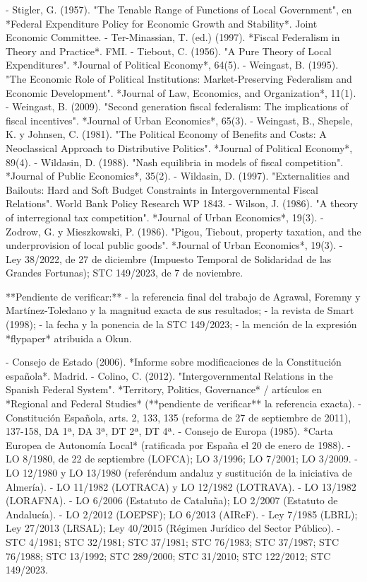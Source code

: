 \documentclass[10pt,a4paper]{article}
\begin{document}
{- Stigler, G. (1957). "The Tenable Range of Functions of Local Government", en *Federal Expenditure Policy for Economic Growth and Stability*. Joint Economic Committee.
- Ter-Minassian, T. (ed.) (1997). *Fiscal Federalism in Theory and Practice*. FMI.
- Tiebout, C. (1956). "A Pure Theory of Local Expenditures". *Journal of Political Economy*, 64(5).
- Weingast, B. (1995). "The Economic Role of Political Institutions: Market-Preserving Federalism and Economic Development". *Journal of Law, Economics, and Organization*, 11(1).
- Weingast, B. (2009). "Second generation fiscal federalism: The implications of fiscal incentives". *Journal of Urban Economics*, 65(3).
- Weingast, B., Shepsle, K. y Johnsen, C. (1981). "The Political Economy of Benefits and Costs: A Neoclassical Approach to Distributive Politics". *Journal of Political Economy*, 89(4).
- Wildasin, D. (1988). "Nash equilibria in models of fiscal competition". *Journal of Public Economics*, 35(2).
- Wildasin, D. (1997). "Externalities and Bailouts: Hard and Soft Budget Constraints in Intergovernmental Fiscal Relations". World Bank Policy Research WP 1843.
- Wilson, J. (1986). "A theory of interregional tax competition". *Journal of Urban Economics*, 19(3).
- Zodrow, G. y Mieszkowski, P. (1986). "Pigou, Tiebout, property taxation, and the underprovision of local public goods". *Journal of Urban Economics*, 19(3).
- Ley 38/2022, de 27 de diciembre (Impuesto Temporal de Solidaridad de las Grandes Fortunas); STC 149/2023, de 7 de noviembre.

**Pendiente de verificar:**
- la referencia final del trabajo de Agrawal, Foremny y Martínez-Toledano y la magnitud exacta de sus resultados;
- la revista de Smart (1998);
- la fecha y la ponencia de la STC 149/2023;
- la mención de la expresión *flypaper* atribuida a Okun.

- Consejo de Estado (2006). *Informe sobre modificaciones de la Constitución española*. Madrid.
- Colino, C. (2012). "Intergovernmental Relations in the Spanish Federal System". *Territory, Politics, Governance* / artículos en *Regional and Federal Studies* (**pendiente de verificar** la referencia exacta).
- Constitución Española, arts. 2, 133, 135 (reforma de 27 de septiembre de 2011), 137-158, DA 1ª, DA 3ª, DT 2ª, DT 4ª.
- Consejo de Europa (1985). *Carta Europea de Autonomía Local* (ratificada por España el 20 de enero de 1988).
- LO 8/1980, de 22 de septiembre (LOFCA); LO 3/1996; LO 7/2001; LO 3/2009.
- LO 12/1980 y LO 13/1980 (referéndum andaluz y sustitución de la iniciativa de Almería).
- LO 11/1982 (LOTRACA) y LO 12/1982 (LOTRAVA).
- LO 13/1982 (LORAFNA).
- LO 6/2006 (Estatuto de Cataluña); LO 2/2007 (Estatuto de Andalucía).
- LO 2/2012 (LOEPSF); LO 6/2013 (AIReF).
- Ley 7/1985 (LBRL); Ley 27/2013 (LRSAL); Ley 40/2015 (Régimen Jurídico del Sector Público).
- STC 4/1981; STC 32/1981; STC 37/1981; STC 76/1983; STC 37/1987; STC 76/1988; STC 13/1992; STC 289/2000; STC 31/2010; STC 122/2012; STC 149/2023.

}
\end{document}
